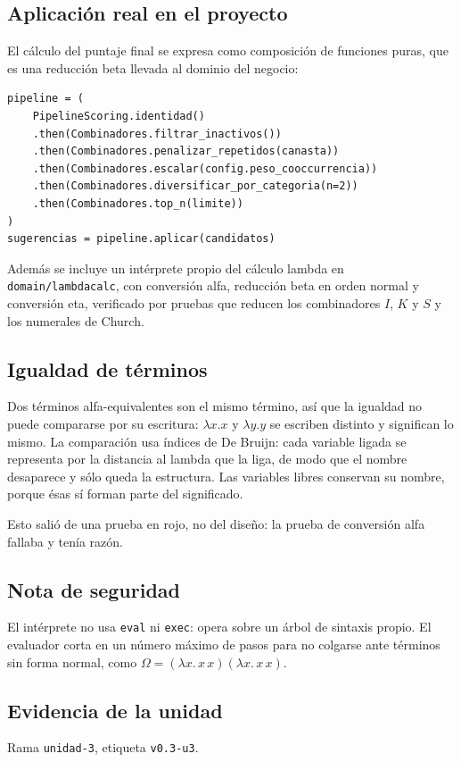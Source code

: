 \documentclass[11pt,letterpaper]{article}
\begin{document}
\subsection{Aplicación real en el proyecto}
El cálculo del puntaje final se expresa como composición de funciones puras,
que es una reducción beta llevada al dominio del negocio:

\begin{lstlisting}[caption={Pipeline de scoring como composicion de funciones.}]
pipeline = (
    PipelineScoring.identidad()
    .then(Combinadores.filtrar_inactivos())
    .then(Combinadores.penalizar_repetidos(canasta))
    .then(Combinadores.escalar(config.peso_cooccurrencia))
    .then(Combinadores.diversificar_por_categoria(n=2))
    .then(Combinadores.top_n(limite))
)
sugerencias = pipeline.aplicar(candidatos)
\end{lstlisting}

Además se incluye un intérprete propio del cálculo lambda en
\texttt{domain/lambdacalc}, con conversión alfa, reducción beta en orden normal
y conversión eta, verificado por pruebas que reducen los combinadores $I$, $K$ y
$S$ y los numerales de Church.

\subsection{Igualdad de términos}
Dos términos alfa-equivalentes son el mismo término, así que la igualdad no
puede compararse por su escritura: $\lambda x.x$ y $\lambda y.y$ se escriben
distinto y significan lo mismo. La comparación usa índices de De Bruijn: cada
variable ligada se representa por la distancia al lambda que la liga, de modo
que el nombre desaparece y sólo queda la estructura. Las variables libres
conservan su nombre, porque ésas sí forman parte del significado.

Esto salió de una prueba en rojo, no del diseño: la prueba de conversión alfa
fallaba y tenía razón.

\subsection{Nota de seguridad}
El intérprete no usa \texttt{eval} ni \texttt{exec}: opera sobre un árbol de
sintaxis propio. El evaluador corta en un número máximo de pasos para no
colgarse ante términos sin forma normal, como
$\Omega = (\lambda x.\,x\,x)(\lambda x.\,x\,x)$.

\subsection{Evidencia de la unidad}
Rama \texttt{unidad-3}, etiqueta \texttt{v0.3-u3}.
\end{document}
